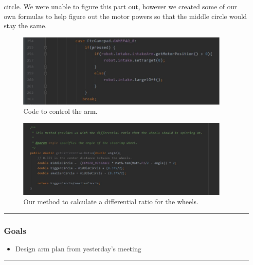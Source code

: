 circle. We were unable to figure this part out, however we created some of our own formulas to help figure out the motor powers so that the middle circle would stay the same.

\begin{figure}[htp]
\centering
\includegraphics[width=0.95\textwidth, angle=0]{Meetings/October/10-29-21/armForcefield - Ritam R.JPG}
\caption{Code to control the arm.}
\label{fig:102921_1}
\end{figure}

\begin{figure}[htp]
\centering
\includegraphics[width=0.95\textwidth, angle=0]{Meetings/October/10-29-21/getDifferentialRatio - Ritam R.JPG}
\caption{Our method to calculate a differential ratio for the wheels.}
\label{fig:102921_2}
\end{figure}


\noindent\hfil\rule{\textwidth}{.4pt}\hfil
\subsubsection*{Goals}
\begin{itemize}
    \item Design arm plan from yesterday’s meeting

\end{itemize} 

\noindent\hfil\rule{\textwidth}{.4pt}\hfil

